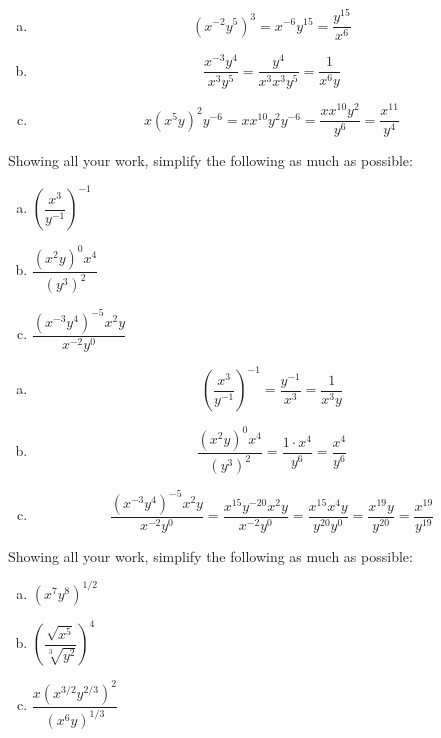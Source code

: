 \documentclass[11pt,letterpaper]{article}
\begin{document}
\sol
\begin{enumerate}[(a)]
\item 
	\[
	(x^{-2} y^5)^3= x^{-6} y^{15}= \dfrac{y^{15}}{x^6}
	\] \pspace

\item 
	\[
	\dfrac{x^{-3}y^4}{x^3y^5}= \dfrac{y^4}{x^3x^3y^5}= \dfrac{1}{x^6 y}
	\] \pspace

\item 
	\[
	x(x^5y)^2y^{-6}= x x^{10} y^2 y^{-6}= \dfrac{xx^{10}y^2}{y^6}= \dfrac{x^{11}}{y^4}
	\]
\end{enumerate}



\newpage



 Showing all your work, simplify the following as much as possible:
        \begin{enumerate}[(a)]
        \item $\left( \dfrac{x^3}{y^{-1}} \right)^{-1}$
        \item $\dfrac{(x^2y)^0 x^4}{(y^3)^2}$
        \item $\dfrac{(x^{-3} y^4)^{-5} x^2y}{x^{-2} y^0}$
        \end{enumerate} \pspace

\sol
\begin{enumerate}[(a)]
\item 
	\[
	\left( \dfrac{x^3}{y^{-1}} \right)^{-1}= \dfrac{y^{-1}}{x^3}= \dfrac{1}{x^3y}
	\] \pspace

\item 
	\[
	\dfrac{(x^2y)^0 x^4}{(y^3)^2}= \dfrac{1 \cdot x^4}{y^6}= \dfrac{x^4}{y^6}
	\] \pspace

\item 
	\[
	\dfrac{(x^{-3} y^4)^{-5} x^2y}{x^{-2} y^0}= \dfrac{x^{15} y^{-20} x^2 y}{x^{-2} y^0}= \dfrac{x^{15} x^4 y}{y^{20} y^0}= \dfrac{x^{19}y}{y^{20}}= \dfrac{x^{19}}{y^{19}}
	\]
\end{enumerate}



\newpage



 Showing all your work, simplify the following as much as possible:
        \begin{enumerate}[(a)]
        \item $(x^7 y^8)^{1/2}$
        \item $\left( \dfrac{\sqrt{x^5}}{\sqrt[3]{y^2}} \right)^4$
        \item $\dfrac{x(x^{3/2}y^{2/3})^2}{(x^6 y)^{1/3}}$
        \end{enumerate} \pspace
\end{document}
